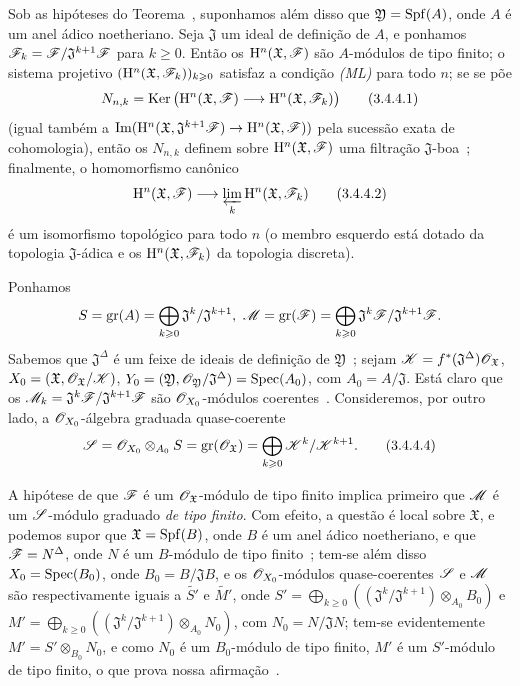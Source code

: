 \begin{corollary}[3.4.4]
\label{III.3.4.4}
Sob as hipóteses do Teorema~, suponhamos além disso que $\mathfrak{Y}=\operatorname{Spf}(A)$, onde $A$ é um anel ádico noetheriano.
Seja $\mathfrak{J}$ um ideal de definição de $A$, e ponhamos $\mathscr{F}_k=\mathscr{F}/\mathfrak{J}^{k+1}\mathscr{F}$ para $k\geq 0$.
Então os $\mathrm{H}^n(\mathfrak{X},\mathscr{F})$ são $A$-módulos de tipo finito; o sistema projetivo $(\mathrm{H}^n(\mathfrak{X},\mathscr{F}_k))_{k\geqslant 0}$ satisfaz a condição \emph{(ML)} para todo $n$; se se põe
\[
\label{III.3.4.4.1}
  N_{n,k}=\Ker\big(\HH^n(\mathfrak{X},\sh{F})\to\HH^n(\mathfrak{X},\sh{F}_k)\big)
  \tag{3.4.4.1}
\]
(igual também a $\Im(\HH^n(\mathfrak{X},\mathfrak{J}^{k+1}\sh{F})\to\HH^n(\mathfrak{X},\sh{F}))$ pela sucessão exata de cohomologia), então os $N_{n,k}$ definem sobre $\mathrm{H}^n(\mathfrak{X},\mathscr{F})$ uma filtração $\mathfrak{J}$-boa~; finalmente, o homomorfismo canônico
\[
\label{III.3.4.4.2}
  \HH^n(\mathfrak{X},\sh{F})\to\varprojlim_k\HH^n(\mathfrak{X},\sh{F}_k)
  \tag{3.4.4.2}
\]
é um isomorfismo topológico para todo $n$ (o membro esquerdo está dotado da topologia $\mathfrak{J}$-ádica e os $\mathrm{H}^n(\mathfrak{X},\mathscr{F}_k)$ da topologia discreta).
\end{corollary}

Ponhamos
\[
\label{III.3.4.4.3}
  S=\gr(A)=\bigoplus_{k\geq 0}\mathfrak{J}^k/\mathfrak{J}^{k+1},\ \sh{M}=\gr(\sh{F})=\bigoplus_{k\geq 0}\mathfrak{J}^k\sh{F}/\mathfrak{J}^{k+1}\sh{F}.
\]
Sabemos que $\mathfrak{J}^\Delta$ é um feixe de ideais de definição de $\mathfrak{Y}$~; sejam $\mathscr{K}=f^*(\mathfrak{J}^\Delta)\mathscr{O}_\mathfrak{X}$, $X_0=(\mathfrak{X},\mathscr{O}_\mathfrak{X}/\mathscr{K})$, $Y_0=(\mathfrak{Y},\mathscr{O}_\mathfrak{Y}/\mathfrak{J}^\Delta)=\operatorname{Spec}(A_0)$, com $A_0=A/\mathfrak{J}$.
Está claro que os $\mathscr{M}_k=\mathfrak{J}^k\mathscr{F}/\mathfrak{J}^{k+1}\mathscr{F}$ são $\mathscr{O}_{X_0}$-módulos coerentes~.
Consideremos, por outro lado, a $\mathscr{O}_{X_0}$-álgebra graduada quase-coerente
\[
\label{III.3.4.4.4}
  \sh{S}=\sh{O}_{X_0}\otimes_{A_0}S=\gr(\sh{O}_\mathfrak{X})=\bigoplus_{k\geq 0}\sh{K}^k/\sh{K}^{k+1}.
  \tag{3.4.4.4}
\]

A hipótese de que $\mathscr{F}$ é um $\mathscr{O}_\mathfrak{X}$-módulo de tipo finito implica primeiro que $\mathscr{M}$ é
um $\mathscr{S}$-módulo graduado \emph{de tipo finito}.
Com efeito, a questão é local sobre $\mathfrak{X}$, e podemos supor que $\mathfrak{X}=\operatorname{Spf}(B)$, onde $B$ é um anel ádico noetheriano, e que $\mathscr{F}=N^\Delta$, onde $N$ é um $B$-módulo de tipo finito~; tem-se além disso $X_0=\operatorname{Spec}(B_0)$, onde $B_0=B/\mathfrak{J}B$, e os $\mathscr{O}_{X_0}$-módulos quase-coerentes $\mathscr{S}$ e $\mathscr{M}$ são respectivamente iguais a $\widetilde{S'}$ e $\widetilde{M'}$, onde $S'=\bigoplus_{k\geq 0}((\mathfrak{J}^k/\mathfrak{J}^{k+1})\otimes_{A_0}B_0)$ e $M'=\bigoplus_{k\geq 0}((\mathfrak{J}^k/\mathfrak{J}^{k+1})\otimes_{A_0}N_0)$, com $N_0=N/\mathfrak{J}N$; tem-se evidentemente $M'=S'\otimes_{B_0}N_0$, e como $N_0$ é um $B_0$-módulo de tipo finito, $M'$ é um $S'$-módulo de tipo finito, o que prova nossa afirmação~.

